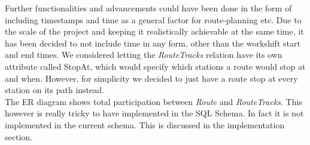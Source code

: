 Further functionalities and advancements could have been done in the form of including timestamps and time as a general factor for route-planning etc. Due to the scale of the project and keeping it realistically achievable at the same time, it has been decided to not include time in any form, other than the workshift start and end times. We considered letting the \emph{RouteTracks} relation have its own attribute called StopAt, which would specify which stations a route would stop at and when. However, for simplicity we decided to just have a route stop at every station on its path instead.\\
The ER diagram shows total participation between \emph{Route} and 
\emph{RouteTracks}. This however is really tricky to have implemented in the 
SQL Schema. In fact it is not implemented in the current schema. This is discussed in the implementation section.
